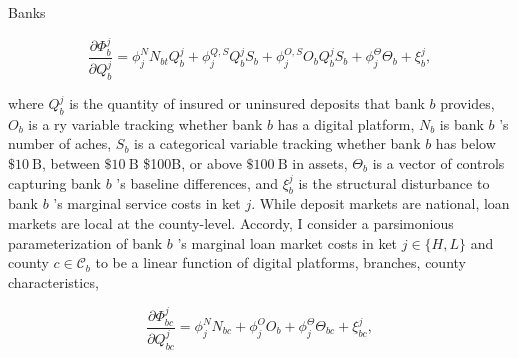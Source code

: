 \documentclass[notes,10pt, aspectratio=169]{beamer}
\newenvironment{wideitemize}{\itemize\addtolength{\itemsep}{10pt}}{\enditemize}
\begin{document}
\begin{frame}{Banks}

\begin{wideitemize}
    \item $$
\frac{\partial \Phi_b^j}{\partial Q_b^j}=\phi_j^N N_{b t} Q_b^j+\phi_j^{Q, S} Q_b^j S_b+\phi_j^{O, S} O_b Q_b^j S_b+\phi_j^{\Theta} \Theta_b+\xi_b^j,
$$

where $Q_b^j$ is the quantity of insured or uninsured deposits that bank $b$ provides, $O_b$ is a ry variable tracking whether bank $b$ has a digital platform, $N_b$ is bank $b$ 's number of aches, $S_b$ is a categorical variable tracking whether bank $b$ has below $\$ 10 \mathrm{~B}$, between $\$ 10 \mathrm{~B}$ \$100B, or above $\$ 100 \mathrm{~B}$ in assets, $\Theta_b$ is a vector of controls capturing bank $b$ 's baseline differences, and $\xi_b^j$ is the structural disturbance to bank $b$ 's marginal service costs in ket $j$.
While deposit markets are national, loan markets are local at the county-level. Accordy, I consider a parsimonious parameterization of bank $b$ 's marginal loan market costs in ket $j \in\{H, L\}$ and county $c \in \mathcal{C}_b$ to be a linear function of digital platforms, branches, county characteristics,

$$
\frac{\partial \Phi_{b c}^j}{\partial Q_{b c}^j}=\phi_j^N N_{b c}+\phi_j^O O_b+\phi_j^{\Theta} \Theta_{b c}+\xi_{b c}^j,
$$

\end{wideitemize}
\end{frame}
\end{document}
